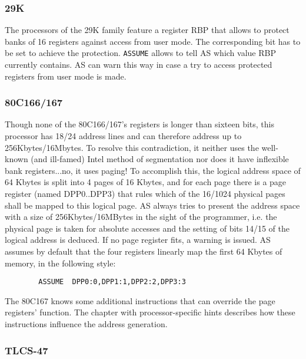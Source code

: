 \documentclass[12pt,twoside]{report}
\newcommand{\tty}[1]{{\tt #1}}
\begin{document}
\subsubsection{29K}

The processors of the 29K family feature a register RBP that allows
to protect banks of 16 registers against access from user mode.  The
corresponding bit has to be set to achieve the protection.  \tty{ASSUME}
allows to tell AS which value RBP currently contains.  AS can warn
this way in case a try to access protected registers from user mode
is made.


\subsubsection{80C166/167}

Though none of the 80C166/167's registers is longer than sixteen bits,
this processor has 18/24 address lines and can therefore address up
to 256Kbytes/16Mbytes.  To resolve this contradiction, it neither
uses the well-known (and ill-famed) Intel method of segmentation nor
does it have inflexible bank registers...no, it uses paging!  To accomplish
this, the logical address space of 64 Kbytes is split into 4 pages of
16 Kbytes, and for each page there is a page register (named
DPP0..DPP3) that rules which of the 16/1024 physical pages shall be
mapped to this logical page.  AS always tries to present the address
space with a size of 256Kbytes/16MBytes in the sight of the
programmer, i.e. the physical page is taken for absolute accesses and
the setting of bits 14/15 of the logical address is deduced.  If no
page register fits, a warning is issued.  AS assumes by default that
the four registers linearly map the first 64 Kbytes of memory, in the
following style:
\begin{verbatim}
        ASSUME  DPP0:0,DPP1:1,DPP2:2,DPP3:3
\end{verbatim}
The 80C167 knows some additional instructions that can override the
page registers' function.  The chapter with processor-specific hints
describes how these instructions influence the address generation.


\subsubsection{TLCS-47}
\end{document}
